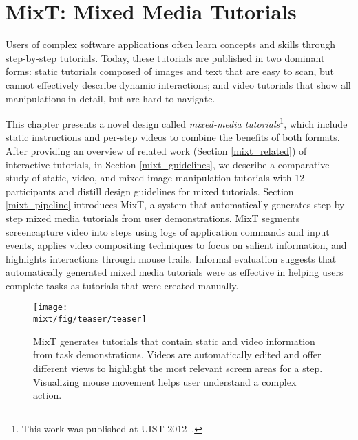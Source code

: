 \chapter{MixT: Mixed Media Tutorials}
\label{chapter_mixt}

Users of complex software applications often learn concepts and skills through step-by-step tutorials. Today, these tutorials are published in two dominant forms: static tutorials composed of images and text that are easy to scan, but cannot effectively describe dynamic interactions; and video tutorials that show all manipulations in detail, but are hard to navigate.

This chapter presents a novel design called \emph{mixed-media tutorials}\footnote{This work was published at UIST 2012~\cite{Chi:2012:MAG:2380116.2380130}.}, which include static instructions and per-step videos to combine the benefits of both formats. After providing an overview of related work (Section \ref{mixt_related}) of interactive tutorials, in Section \ref{mixt_guidelines}, we describe a comparative study of static, video, and mixed image manipulation tutorials with 12 participants and distill design guidelines for mixed tutorials.
%
Section \ref{mixt_pipeline} introduces MixT, a system that automatically generates step-by-step mixed media tutorials from user demonstrations. MixT segments screencapture video into steps using logs of application commands and input events, applies video compositing techniques to focus on salient information, and highlights interactions through mouse trails. Informal evaluation suggests that automatically generated mixed media tutorials were as effective in helping users complete tasks as tutorials that were created manually.
%

\begin{figure*}[t]
  \centering
  \texttt{[image: \\mixt/fig/teaser/teaser]}
  \caption{MixT generates tutorials that contain static and video information from task demonstrations. Videos are automatically edited and offer different views to highlight the most relevant screen areas for a step. Visualizing mouse movement helps user understand a complex action.}
  \label{fig:mixt_teaser}
\end{figure*}











